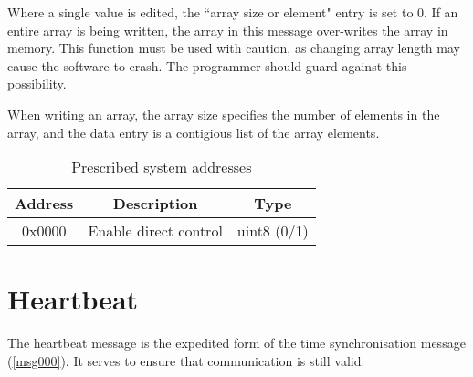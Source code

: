 Where a single value is edited, the ``array size or element" entry is set to 0. If an entire array is being written, the array in this message over-writes the array in memory. This function must be used with caution, as changing array length may cause the software to crash. The programmer should guard against this possibility.

When writing an array, the array size specifies the number of elements in the array, and the data entry is a contigious list of the array elements.

\begin{table}[H]
  \centering
  \begin{tabular}{ c c c }
  Address & Description & Type \\
\hline
  0x0000   & Enable direct control & uint8 (0/1) \\
  \end{tabular}
  \caption{Prescribed system addresses}
  \label{tab:svu:prescribed}
\end{table}

\section{Heartbeat}
\label{msg127}
The heartbeat message is the expedited form of the time synchronisation message (\ref{msg000}). It serves to ensure that communication is still valid.